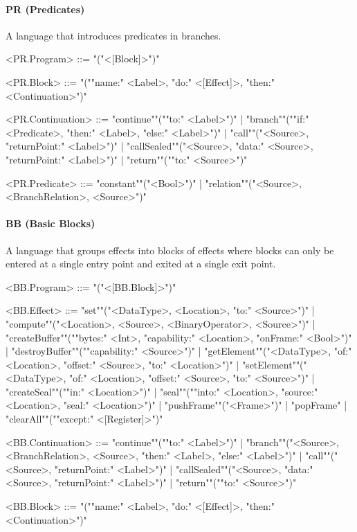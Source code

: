 \documentclass[main.tex]{subfiles}
\begin{document}
\paragraph{ PR (Predicates) } A language that introduces predicates in branches.
\begin{grammar}
	\footnotesize
				<PR.Program> ::=
							"("<[Block]>")"
				\par
				<PR.Block> ::=
							"(""name:" <Label>, "do:" <[Effect]>, "then:" <Continuation>")"
				\par
				<PR.Continuation> ::=
						"continue""(""to:" <Label>")"
						| "branch""(""if:" <Predicate>, "then:" <Label>, "else:" <Label>")"
						| "call""("<Source>, "returnPoint:" <Label>")"
						| "callSealed""("<Source>, "data:" <Source>, "returnPoint:" <Label>")"
						| "return""(""to:" <Source>")"
				\par
				<PR.Predicate> ::=
						"constant""("<Bool>")"
						| "relation""("<Source>, <BranchRelation>, <Source>")"
				\par
\end{grammar}
\par
\paragraph{ BB (Basic Blocks) } A language that groups effects into blocks of effects where blocks can only be entered at a single entry point and exited at a single exit point.
\begin{grammar}
	\footnotesize
				<BB.Program> ::=
							"("<[BB.Block]>")"
				\par
				<BB.Effect> ::=
						"set""("<DataType>, <Location>, "to:" <Source>")"
						| "compute""("<Location>, <Source>, <BinaryOperator>, <Source>")"
						| "createBuffer""(""bytes:" <Int>, "capability:" <Location>, "onFrame:" <Bool>")"
						| "destroyBuffer""(""capability:" <Source>")"
						| "getElement""("<DataType>, "of:" <Location>, "offset:" <Source>, "to:" <Location>")"
						| "setElement""("<DataType>, "of:" <Location>, "offset:" <Source>, "to:" <Source>")"
						| "createSeal""(""in:" <Location>")"
						| "seal""(""into:" <Location>, "source:" <Location>, "seal:" <Location>")"
						| "pushFrame""("<Frame>")"
						| "popFrame"
						| "clearAll""(""except:" <[Register]>")"
				\par
				<BB.Continuation> ::=
						"continue""(""to:" <Label>")"
						| "branch""("<Source>, <BranchRelation>, <Source>, "then:" <Label>, "else:" <Label>")"
						| "call""("<Source>, "returnPoint:" <Label>")"
						| "callSealed""("<Source>, "data:" <Source>, "returnPoint:" <Label>")"
						| "return""(""to:" <Source>")"
				\par
				<BB.Block> ::=
							"(""name:" <Label>, "do:" <[Effect]>, "then:" <Continuation>")"
				\par
\end{grammar}
\par
\end{document}
